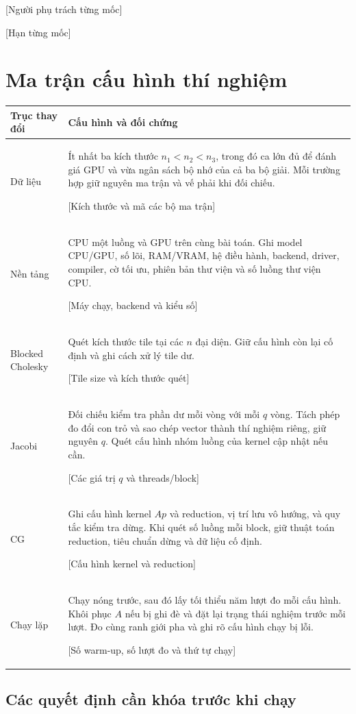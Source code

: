 \documentclass[11pt,a4paper]{article}
\newcommand{\dien}[1]{\colorbox{placeholder}{\strut\small [#1]}}
\begin{document}
\noindent \dien{Người phụ trách từng mốc} \quad \dien{Hạn từng mốc}

\newpage
\section{Ma trận cấu hình thí nghiệm}

\noindent\begin{tabularx}{\textwidth}{@{}p{}Y@{}}
\toprule
Trục thay đổi & Cấu hình và đối chứng \\
\midrule
Dữ liệu &
Ít nhất ba kích thước $n_1<n_2<n_3$,
trong đó ca lớn đủ để đánh giá GPU và vừa ngân sách bộ nhớ của cả ba
bộ giải. Mỗi trường hợp giữ nguyên ma trận và vế phải khi đối chiếu.
\newline \dien{Kích thước và mã các bộ ma trận} \\
\addlinespace
Nền tảng &
CPU một luồng và GPU trên cùng bài toán. Ghi model CPU/GPU, số lõi,
RAM/VRAM, hệ điều hành, backend, driver, compiler, cờ tối ưu, phiên
bản thư viện và số luồng thư viện CPU.
\newline \dien{Máy chạy, backend và kiểu số} \\
\addlinespace
Blocked Cholesky &
Quét kích thước tile tại các $n$ đại diện. Giữ cấu hình còn lại cố định
và ghi cách xử lý tile dư.
\newline \dien{Tile size và kích thước quét} \\
\addlinespace
Jacobi &
Đối chiếu kiểm tra phần dư mỗi vòng với mỗi $q$ vòng. Tách phép đo đổi
con trỏ và sao chép vector thành thí nghiệm riêng, giữ nguyên $q$.
Quét cấu hình nhóm luồng của kernel cập nhật nếu cần.
\newline \dien{Các giá trị \(q\) và threads/block} \\
\addlinespace
CG &
Ghi cấu hình kernel $Ap$ và reduction, vị trí lưu vô hướng, và quy tắc
kiểm tra dừng. Khi quét số luồng mỗi block, giữ thuật toán reduction,
tiêu chuẩn dừng và dữ liệu cố định.
\newline \dien{Cấu hình kernel và reduction} \\
\addlinespace
Chạy lặp &
Chạy nóng trước, sau đó lấy tối thiểu năm lượt đo mỗi cấu hình.
Khôi phục $A$ nếu bị ghi đè và đặt lại trạng thái nghiệm trước mỗi lượt.
Đo cùng ranh giới pha và ghi rõ cấu hình chạy bị lỗi.
\newline \dien{Số warm-up, số lượt đo và thứ tự chạy} \\
\bottomrule
\end{tabularx}

\subsection{Các quyết định cần khóa trước khi chạy}
\end{document}
